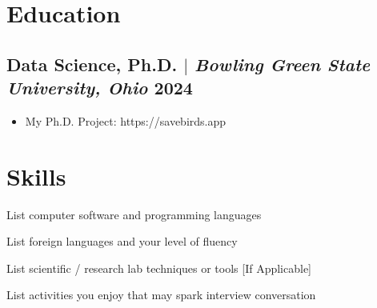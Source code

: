 \documentclass[11pt]{article} %
\begin{document}
\section{Education}
\subsection{Data Science, Ph.D. $|$ {\normalfont\itshape Bowling Green State University, Ohio } \hfill 2024} 
\begin{itemize}
	\item My Ph.D. Project: https://savebirds.app
\end{itemize}

\section{Skills}
\begin{description}[itemsep=0pt]
	\item[Technical] List computer software and programming languages
	\item[Language] List foreign languages and your level of fluency
	\item[Laboratory] List scientific / research lab techniques or tools [If Applicable]
	\item[Interests] List activities you enjoy that may spark interview conversation
\end{description}
\end{document}
